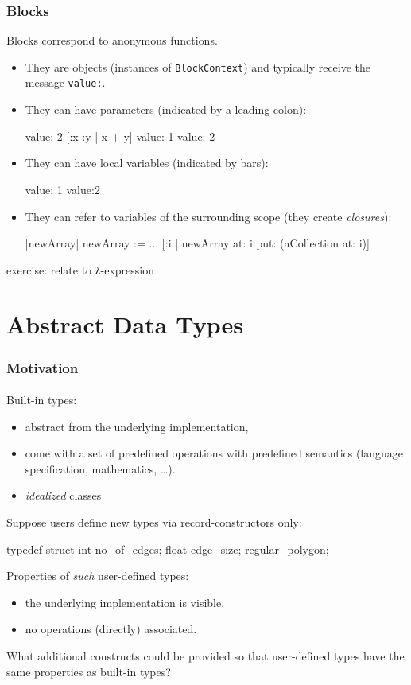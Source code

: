 \documentclass{beamer}
\begin{document}
\begin{frame}[fragile]
\frametitle{Blocks}
Blocks %
correspond to anonymous functions. 

\begin{itemize}
\item They are objects (instances of \texttt{BlockContext}) and
typically receive the message \texttt{value:}.
\item They can have parameters (indicated by a leading colon):

\begin{cplus3}
[:x | 1 + x] value: 2
[:x :y | x + y] value: 1 value: 2
\end{cplus3}

\item They can  have local variables (indicated by bars):
\begin{cplus3}
[:x :y |  |z| z := x + y] value: 1 value:2 
\end{cplus3}

\item They can refer to variables of the surrounding scope
(they create \emph{closures}):
\begin{cplus3}
|newArray|
newArray :=  ... 
[:i | newArray at: i put: (aCollection at: i)]
\end{cplus3}
\end{itemize}

exercise: relate to λ-expression
\end{frame}


\section{Abstract Data Types}

\begin{frame}[fragile]
\frametitle{Motivation}
\framesubtitle{}
Built-in types:
\begin{itemize}
\item abstract from the underlying implementation, 
\item come with a set of predefined operations with predefined semantics
(language specification, mathematics, \ldots).
\item \emph{idealized} classes
\end{itemize}
\bigskip

Suppose users define new types via record-constructors only: 
\begin{cplus2}
       typedef struct {
          int   no_of_edges;
          float edge_size;
       } regular_polygon;
\end{cplus2}
Properties of \textit{such} user-defined types:
\begin{itemize}
\item the underlying implementation is visible,
\item no operations  (directly) associated. 
\end{itemize}
\bigskip

What additional constructs could be provided so that user-defined types
have the same properties as built-in types?

\end{frame}
\end{document}
